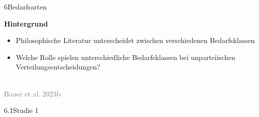 \documentclass[xcolor=table,9pt,aspectratio=169]{beamer}
\begin{document}
\begin{frame}{\vspace*{10mm}6\hspace*{1em}Bedarfsarten}
\begin{multicols}{2}
   \textbf{Hintergrund}\\
   \begin{itemize}
      \item Philosophische Literatur unterscheidet zwischen verschiedenen Bedarfsklassen
      \item Welche Rolle spielen unterschiedliche Bedarfsklassen bei unparteiischen Verteilungsentscheidungen?
   \end{itemize}
   \vfill
   \begin{center}
      \\
      \footnotesize{\textcolor{gray}{Bauer et al. 2023b}}
   \end{center}
\end{multicols}
\end{frame}


\begin{frame}
\begin{overlayarea}{\textwidth}{0.81\paperheight}{
   \vspace*{11mm}
   \textcolor{uolblue}
   {6.1\hspace*{1em}Studie 1}
}
\end{overlayarea}
\end{frame}
\end{document}
